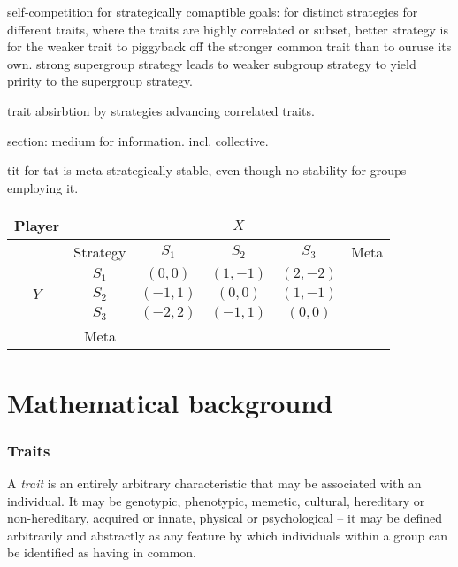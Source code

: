 \documentclass[twocolumn, aps, rmp, amsmath, amssymb, nofootinbib, superscriptaddress, longbibliography, floatfix, table-of-contents, eqsecnum]{revtex4-1}
\begin{document}
self-competition for strategically comaptible goals:
for distinct strategies for different traits, where the traits are highly correlated or subset, better strategy is for the weaker trait to piggyback off the stronger common trait than to ouruse its own. strong supergroup strategy leads to weaker subgroup strategy to yield pririty to the supergroup strategy.

trait absirbtion by strategies advancing correlated traits. 

section: medium for information. incl. collective.

tit for tat is meta-strategically stable, even though no stability for groups employing it.

\begin{table}[!htbp]
\begin{tabular}{|c|c|c|c|c|c|}
\hline
Player               &          & \multicolumn{3}{c|}{$X$}       &      \\ \hline
                     & Strategy & $S_1$    & $S_2$    & $S_3$    & Meta \\ \hline
\multirow{3}{*}{$Y$} & $S_1$    & $(0,0)$  & $(1,-1)$ & $(2,-2)$ &      \\ \cline{2-6} 
                     & $S_2$    & $(-1,1)$ & $(0,0)$  & $(1,-1)$ &      \\ \cline{2-6} 
                     & $S_3$    & $(-2,2)$ & $(-1,1)$ & $(0,0)$  &      \\ \hline
                     & Meta     &          &          &          &      \\ \hline
\end{tabular}
\end{table}

%
%

\part{Mathematical background}

\section{Traits}

A \textit{trait} is an entirely arbitrary characteristic that may be associated with an individual. It may be genotypic, phenotypic, memetic, cultural, hereditary or non-hereditary, acquired or innate, physical or psychological -- it may be defined arbitrarily and abstractly as any feature by which individuals within a group can be identified as having in common.
\end{document}
